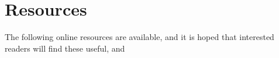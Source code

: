 \section{Resources}

The following online resources are available, and it is hoped that interested readers will find these useful, and 
